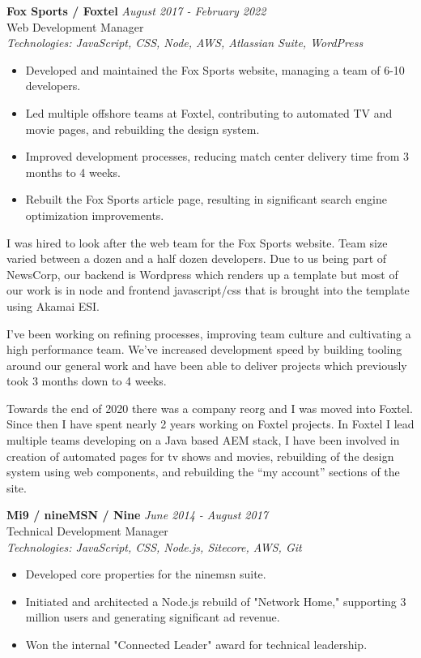 \documentclass[a4paper,10pt]{article}
\begin{document}
\textbf{Fox Sports / Foxtel} \hfill \textit{August 2017 - February 2022} \\
Web Development Manager \\
\textit{Technologies: JavaScript, CSS, Node, AWS, Atlassian Suite, WordPress}
\begin{itemize}
    \item Developed and maintained the Fox Sports website, managing a team of 6-10 developers.
    \item Led multiple offshore teams at Foxtel, contributing to automated TV and movie pages, and rebuilding the design system.
    \item Improved development processes, reducing match center delivery time from 3 months to 4 weeks.
    \item Rebuilt the Fox Sports article page, resulting in significant search engine optimization improvements.
\end{itemize}

I was hired to look after the web team for the Fox Sports website. Team size varied between a dozen and a half dozen developers. Due to us being part of NewsCorp, our backend is Wordpress which renders up a template but most of our work is in node and frontend javascript/css that is brought into the template using Akamai ESI.

I’ve been working on refining processes, improving team culture and cultivating a high performance team. We’ve increased development speed by building tooling around our general work and have been able to deliver projects which previously took 3 months down to 4 weeks.

Towards the end of 2020 there was a company reorg and I was moved into Foxtel. Since then I have spent nearly 2 years working on Foxtel projects. In Foxtel I lead multiple teams developing on a Java based AEM stack, I have been involved in creation of automated pages for tv shows and movies, rebuilding of the design system using web components, and rebuilding the “my account” sections of the site.

\vspace{1em}

\textbf{Mi9 / nineMSN / Nine} \hfill \textit{June 2014 - August 2017} \\
Technical Development Manager \\
\textit{Technologies: JavaScript, CSS, Node.js, Sitecore, AWS, Git}
\begin{itemize}
    \item Developed core properties for the ninemsn suite.
    \item Initiated and architected a Node.js rebuild of "Network Home," supporting 3 million users and generating significant ad revenue.
    \item Won the internal "Connected Leader" award for technical leadership.
\end{itemize}
\end{document}
